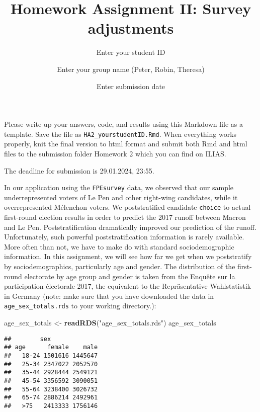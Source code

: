 \documentclass[
]{article}
\title{Homework Assignment II: Survey adjustments}
\subtitle{Enter your student ID}
\author{Enter your group name (Peter, Robin, Theresa)}
\date{Enter submission date}
\newenvironment{Shaded}{\begin{snugshade}}{\end{snugshade}}
\newcommand{\AttributeTok}[1]{\textcolor[rgb]{0.13,0.29,0.53}{#1}}
\newcommand{\ConstantTok}[1]{\textcolor[rgb]{0.56,0.35,0.01}{#1}}
\newcommand{\FunctionTok}[1]{\textcolor[rgb]{0.13,0.29,0.53}{\textbf{#1}}}
\newcommand{\NormalTok}[1]{#1}
\newcommand{\OtherTok}[1]{\textcolor[rgb]{0.56,0.35,0.01}{#1}}
\newcommand{\SpecialCharTok}[1]{\textcolor[rgb]{0.81,0.36,0.00}{\textbf{#1}}}
\newcommand{\StringTok}[1]{\textcolor[rgb]{0.31,0.60,0.02}{#1}}
\begin{document}
\maketitle

\begin{Shaded}
\end{Shaded}

Please write up your answers, code, and results using this Markdown file
as a template. Save the file as \texttt{HA2\_yourstudentID.Rmd}. When
everything works properly, knit the final version to html format and
submit both Rmd and html files to the submission folder Homework 2 which
you can find on ILIAS.

The deadline for submission is 29.01.2024, 23:55.

In our application using the \texttt{FPEsurvey} data, we observed that
our sample underrepresented voters of Le Pen and other right-wing
candidates, while it overrepresented Mélenchon voters. We poststratified
candidate \texttt{choice} to actual first-round election results in
order to predict the 2017 runoff between Macron and Le Pen.
Poststratification dramatically improved our prediction of the runoff.
Unfortunately, such powerful poststratification information is rarely
available. More often than not, we have to make do with standard
sociodemographic information. In this assignment, we will see how far we
get when we poststratify by sociodemographics, particularly age and
gender. The distribution of the first-round electorate by age group and
gender is taken from the Enquête sur la participation électorale 2017,
the equivalent to the Repräsentative Wahlstatistik in Germany (note:
make sure that you have downloaded the data in
\texttt{age\_sex\_totals.rds} to your working directory.):

\begin{Shaded}
\begin{Highlighting}[]
\NormalTok{age\_sex\_totals }\OtherTok{\textless{}{-}} \FunctionTok{readRDS}\NormalTok{(}\StringTok{"age\_sex\_totals.rds"}\NormalTok{)}
\NormalTok{age\_sex\_totals}
\end{Highlighting}
\end{Shaded}

\begin{verbatim}
##        sex
## age      female    male
##   18-24 1501616 1445647
##   25-34 2347022 2052570
##   35-44 2928444 2549121
##   45-54 3356592 3090051
##   55-64 3238400 3026732
##   65-74 2886214 2492961
##   >75   2413333 1756146
\end{verbatim}
\end{document}
